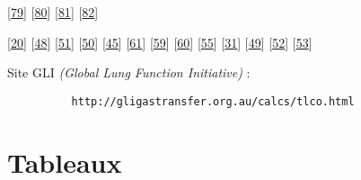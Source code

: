 \documentclass[12pt,]{article}
\begin{document}
{[}\protect\hyperlink{ref-anto2001epidemiology}{79}{]}
{[}\protect\hyperlink{ref-charvanne2008bronchopneumopathie}{80}{]}
{[}\protect\hyperlink{ref-roche2007donnees}{81}{]}
{[}\protect\hyperlink{ref-fuhrman2007mortalite}{82}{]}

{[}\protect\hyperlink{ref-chilton1952mathematical}{20}{]}
{[}\protect\hyperlink{ref-yaron1996utility}{48}{]}
{[}\protect\hyperlink{ref-you1994expiratory}{51}{]}
{[}\protect\hyperlink{ref-krauss2005capnogram}{50}{]}
{[}\protect\hyperlink{ref-hisamuddin2009correlations}{45}{]}
{[}\protect\hyperlink{ref-mieloszyk2014automated}{61}{]}
{[}\protect\hyperlink{ref-kazemi2013frequency}{59}{]}
{[}\protect\hyperlink{ref-kazemi2016new}{60}{]}
{[}\protect\hyperlink{ref-betancourt2014segmented}{55}{]}
{[}\protect\hyperlink{ref-howe2011use}{31}{]}
{[}\protect\hyperlink{ref-egleston1997capnography}{49}{]}
{[}\protect\hyperlink{ref-smalhout1975atlas}{52}{]}
{[}\protect\hyperlink{ref-kelsey1962expiratory}{53}{]}

Site GLI \emph{(Global Lung Function Initiative)} :

\begin{verbatim}
          http://gligastransfer.org.au/calcs/tlco.html
\end{verbatim}

\pagebreak

\hypertarget{tableaux}{%
\section{Tableaux}\label{tableaux}}
\end{document}
